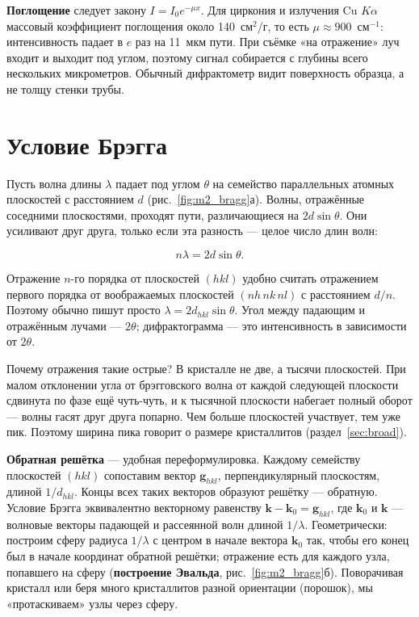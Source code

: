 \textbf{Поглощение} следует закону $I = I_0e^{-\mu x}$. Для циркония и излучения Cu $K\alpha$ массовый коэффициент
поглощения около 140~см$^2$/г, то есть $\mu\approx900$~см$^{-1}$: интенсивность падает в $e$ раз на 11~мкм пути. При
съёмке «на отражение» луч входит и выходит под углом, поэтому сигнал собирается с глубины всего нескольких
микрометров. Обычный дифрактометр видит поверхность образца, а не толщу стенки трубы.

\section{Условие Брэгга}

Пусть волна длины $\lambda$ падает под углом $\theta$ на семейство параллельных атомных плоскостей с расстоянием $d$
(рис.~\ref{fig:m2_bragg}а). Волны, отражённые соседними плоскостями, проходят пути, различающиеся на $2d\sin\theta$.
Они усиливают друг друга, только если эта разность --- целое число длин волн:
\begin{keyf}
\[
n\lambda = 2d\sin\theta .
\]
\end{keyf}
Отражение $n$-го порядка от плоскостей $(hkl)$ удобно считать отражением первого порядка от воображаемых плоскостей
$(nh\,nk\,nl)$ с расстоянием $d/n$. Поэтому обычно пишут просто $\lambda = 2d_{hkl}\sin\theta$. Угол между падающим
и отражённым лучами --- $2\theta$; дифрактограмма --- это интенсивность в зависимости от $2\theta$.


\begin{idea}
Почему отражения такие острые? В кристалле не две, а тысячи плоскостей. При малом отклонении угла от брэгговского
волна от каждой следующей плоскости сдвинута по фазе ещё чуть-чуть, и к тысячной плоскости набегает полный
оборот --- волны гасят друг друга попарно. Чем больше плоскостей участвует, тем уже пик. Поэтому ширина пика
говорит о размере кристаллитов (раздел~\ref{sec:broad}).
\end{idea}

\textbf{Обратная решётка} --- удобная переформулировка. Каждому семейству плоскостей $(hkl)$ сопоставим вектор
$\mathbf g_{hkl}$, перпендикулярный плоскостям, длиной $1/d_{hkl}$. Концы всех таких векторов образуют решётку ---
обратную. Условие Брэгга эквивалентно векторному равенству $\mathbf k - \mathbf k_0 = \mathbf g_{hkl}$, где
$\mathbf k_0$ и $\mathbf k$ --- волновые векторы падающей и рассеянной волн длиной $1/\lambda$. Геометрически: построим
сферу радиуса $1/\lambda$ с центром в начале вектора $\mathbf k_0$ так, чтобы его конец был в начале координат обратной
решётки; отражение есть для каждого узла, попавшего на сферу (\textbf{построение Эвальда},
рис.~\ref{fig:m2_bragg}б). Поворачивая кристалл или беря много кристаллитов разной ориентации (порошок), мы
«протаскиваем» узлы через сферу.

